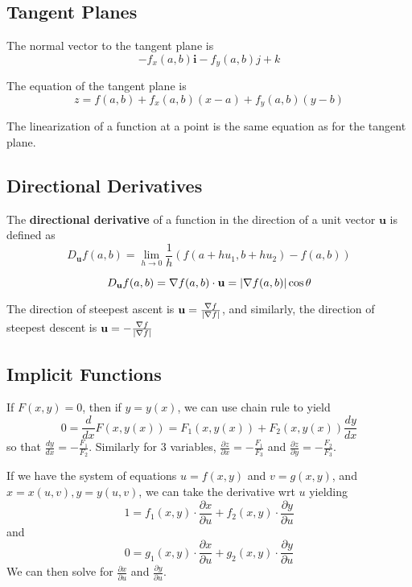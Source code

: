 \documentclass{article}
\begin{document}
\subsection{Tangent Planes}
\begin{theorem}
  The normal vector to the tangent plane is \[
    -f_x(a, b)\textbf{i} - f_y(a, b)j + k
  \]
\end{theorem}
\begin{theorem}
  The equation of the tangent plane is \[
    z = f(a, b) + f_x(a, b)(x-a) + f_y(a, b)(y-b)
  \]
\end{theorem}
\begin{proposition}
  The linearization of a function at a point is the same equation as for the tangent plane.
\end{proposition}
\subsection{Directional Derivatives}
\begin{definition}
  The \textbf{directional derivative} of a function in the direction of a unit vector $\textbf{u}$ is defined as \[
    D_\textbf{u}f(a, b) = \lim_{h\to0}\frac{1}{h} (f(a + hu_1, b+hu_2) - f(a, b))
  \]
\end{definition}
\begin{theorem}
  \[D_\textbf{u}f(a, b) = \nabla f(a, b) \cdot \textbf{u} = \abs{\nabla f(a, b)}\cos\theta\]
\end{theorem}
\begin{corollary}
  The direction of steepest ascent is $\textbf{u} = \frac{\nabla f}{\abs{\nabla f}}$, and similarly, the direction of steepest descent is $\textbf{u} = -\frac{\nabla f}{\abs{\nabla f}}$
\end{corollary}
\subsection{Implicit Functions}
\begin{theorem}
  If $F(x, y) = 0$, then if $y = y(x)$, we can use chain rule to yield \[
    0 = \frac{d}{dx} F(x, y(x)) = F_1(x, y(x)) + F_2(x, y(x))\frac{dy}{dx}
  \] so that $\frac{dy}{dx} = -\frac{F_1}{F_2}$. Similarly for $3$ variables, $\frac{\partial z}{\partial x} = -\frac{F_1}{F_3}$ and $\frac{\partial z}{\partial y} = -\frac{F_2}{F_3}$.
\end{theorem}
\begin{theorem}
  If we have the system of equations $u = f(x, y)$ and $v = g(x, y)$, and $x = x(u, v), y=y(u,v)$, we can take the derivative wrt $u$ yielding \[
    1 = f_1(x, y) \cdot \frac{\partial x}{\partial u} + f_2(x, y) \cdot \frac{\partial y}{\partial u}
  \] and \[
    0 = g_1(x, y) \cdot \frac{\partial x}{\partial u} + g_2(x, y) \cdot \frac{\partial y}{\partial u}
  \]
  We can then solve for $\frac{\partial x}{\partial u}$ and $\frac{\partial y}{\partial u}$.
\end{theorem}
\end{document}
